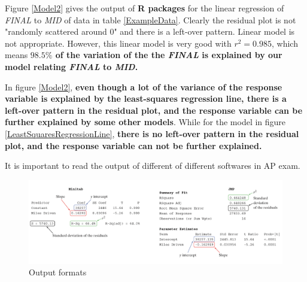 \documentclass[a4paper, 12pt,twoside]{book}
\begin{document}
\begin{itemize}
Figure \ref{Model2} gives the output of \textbf{R packages} for the linear regression of  \textit{FINAL} to \textit{MID} of data in table \ref{ExampleData}. Clearly the residual plot is not "randomly scattered around 0" and there is a left-over pattern. Linear model is not appropriate. However, this linear model is very good with $r^2 = 0.985$, which means\textbf{ $\mathbf{98.5\%}$ of the variation of the the \textit{FINAL} is explained by our model relating \textit{FINAL} to \textit{MID}.}
\vspace{0.6cm}


In figure \ref{Model2}, \textbf{even though a lot of the variance of the response variable is explained by the least-squares regression line, there is a left-over pattern in the residual plot, and the response variable  can be further explained by some other models}. While for the model in figure \ref{LeastSquaresRegressionLine}, \textbf{there is no left-over pattern in the  residual plot, and the response variable can not be further explained.}\vspace{0.6cm}

\colorbox{babypink}{
\begin{minipage}{\textwidth}
It is important to read the output of different of different softwares in AP exam.
\end{minipage}
}

\begin{figure}[H]
\centering
\includegraphics[scale=0.5]{OutputFormat.png}
\caption{Output formats}
\label{OutputFormat}
\end{figure}

\end{itemize}
\newpage
\end{document}
